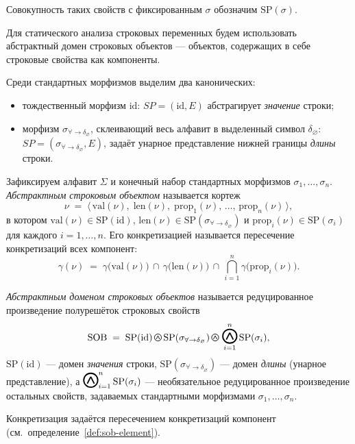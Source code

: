 \documentclass[fontsize=14pt]{scrartcl}
\newcommand{\SP}{\mathrm{SP}}
\newcommand{\SOB}{\mathrm{SOB}}
\newcommand{\Reduced}[1]{\mathbin{\begin{tikzpicture}[x=#1ex,y=#1ex,line width=(#1)/4.0*1ex] \draw (-0.7,-0.7) -- (0,0.7) (0.7,-0.7) -- (0,0.7); \draw (0,0) circle (1.41);\end{tikzpicture}}}
\newcommand{\treduced}{\raisebox{-0.2ex}{\,$\Reduced{0.6}$\,}}
\newcommand{\bigreduced}[2]{\mathop{\raisebox{-0.8ex}{$\Reduced{1.2}$}}_{#1}^{#2}}
\begin{document}
Совокупность таких свойств с фиксированным $\sigma$ обозначим $\SP(\sigma)$.

Для статического анализа строковых переменных будем использовать абстрактный домен строковых объектов --- 
объектов, содержащих в себе строковые свойства как компоненты.

Среди стандартных морфизмов выделим два канонических:
\begin{itemize}
    \item тождественный морфизм $\mathrm{id}$: $SP = (\mathrm{id}, E)$ абстрагирует 
    \emph{значение} строки;
    \item морфизм $\sigma_{\forall\to\delta_\varnothing}$, склеивающий весь алфавит
    в выделенный символ $\delta_\varnothing$: $SP = (\sigma_{\forall\to\delta_\varnothing}, E)$,
    задаёт унарное представление нижней границы \emph{длины} строки.
\end{itemize}

\begin{Definition}
\label{def:sob-element}
Зафиксируем алфавит $\Sigma$ и конечный набор стандартных морфизмов
$\sigma_1, \ldots, \sigma_n$.
\emph{Абстрактным строковым объектом} называется кортеж
\[
    \nu \;=\; \bigl\langle\, \mathrm{val}(\nu),\; \mathrm{len}(\nu),\;
        \mathrm{prop}_1(\nu),\, \ldots,\, \mathrm{prop}_n(\nu) \,\bigr\rangle,
\]
в котором $\mathrm{val}(\nu) \in \SP(\mathrm{id})$,
$\mathrm{len}(\nu) \in \SP(\sigma_{\forall\to\delta_\varnothing})$ и
$\mathrm{prop}_i(\nu) \in \SP(\sigma_i)$ для каждого $i = 1, \ldots, n$.
Его конкретизацией называется пересечение конкретизаций всех компонент:
\[
    \gamma(\nu) \;=\; \gamma\bigl(\mathrm{val}(\nu)\bigr) \,\cap\, \gamma\bigl(\mathrm{len}(\nu)\bigr)
        \,\cap\, \bigcap_{i=1}^{n} \gamma\bigl(\mathrm{prop}_i(\nu)\bigr).
\]
\end{Definition}

\begin{Definition}
\label{def:sob}
\emph{Абстрактным доменом строковых объектов} называется редуцированное произведение
полурешёток строковых свойств
\[
    \SOB \;=\; \SP(\mathrm{id}) \treduced \SP(\sigma_{\forall\to\delta_\varnothing})
        \treduced \bigreduced{i=1}{n} \SP(\sigma_i),
\]
$\SP(\mathrm{id})$ --- домен \emph{значения} строки, $\SP(\sigma_{\forall\to\delta_\varnothing})$ ---
домен \emph{длины} (унарное представление), а $\bigreduced{i=1}{n} \SP(\sigma_i)$ ---
необязательное редуцированное произведение остальных свойств, задаваемых стандартными
морфизмами $\sigma_1, \ldots, \sigma_n$.

Конкретизация задаётся пересечением конкретизаций компонент (см.\ определение~\ref{def:sob-element}).
\end{Definition}
\end{document}

